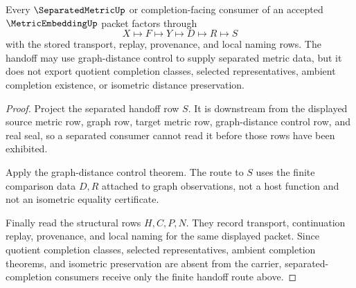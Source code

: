\begin{theorem}
\label{thm:metric-embedding-separated-completion-handoff}
Every $\SeparatedMetricUp$ or completion-facing consumer of an accepted $\MetricEmbeddingUp$ packet factors through
$$
X \longmapsto F \longmapsto Y \longmapsto D \longmapsto R \longmapsto S
$$
with the stored transport, replay, provenance, and local naming rows. The handoff may use graph-distance control to supply separated metric data, but it does not export quotient completion classes, selected representatives, ambient completion existence, or isometric distance preservation.
\end{theorem}
\begin{proof}
Project the separated handoff row $S$. It is downstream from the displayed source metric row, graph row, target metric row, graph-distance control row, and real seal, so a separated consumer cannot read it before those rows have been exhibited.

Apply the graph-distance control theorem. The route to $S$ uses the finite comparison data $D,R$ attached to graph observations, not a host function and not an isometric equality certificate.

Finally read the structural rows $H,C,P,N$. They record transport, continuation replay, provenance, and local naming for the same displayed packet. Since quotient completion classes, selected representatives, ambient completion theorems, and isometric preservation are absent from the carrier, separated-completion consumers receive only the finite handoff route above.
\end{proof}

